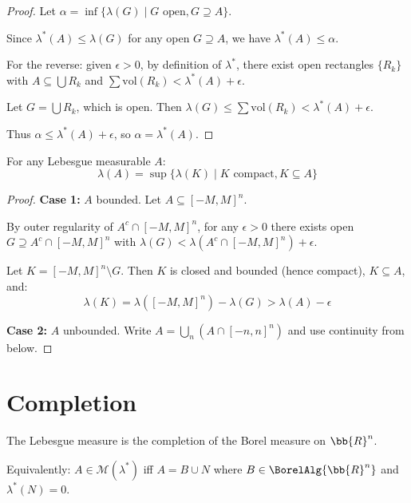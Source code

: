 \begin{proof}
Let $\alpha = \inf \{ \lambda(G) \mid G \text{ open}, G \supseteq A \}$.

Since $\lambda^*(A) \leq \lambda(G)$ for any open $G \supseteq A$, we have $\lambda^*(A) \leq \alpha$.

For the reverse: given $\epsilon > 0$, by definition of $\lambda^*$, there exist open rectangles $\{R_k\}$ with $A \subseteq \bigcup R_k$ and $\sum \text{vol}(R_k) < \lambda^*(A) + \epsilon$.

Let $G = \bigcup R_k$, which is open. Then $\lambda(G) \leq \sum \text{vol}(R_k) < \lambda^*(A) + \epsilon$.

Thus $\alpha \leq \lambda^*(A) + \epsilon$, so $\alpha = \lambda^*(A)$.
\end{proof}

\begin{theorem}
For any Lebesgue measurable $A$:
\[ \lambda(A) = \sup \{ \lambda(K) \mid K \text{ compact}, K \subseteq A \} \]
\end{theorem}

\begin{proof}
\textbf{Case 1:} $A$ bounded. Let $A \subseteq [-M, M]^n$.

By outer regularity of $A^c \cap [-M,M]^n$, for any $\epsilon > 0$ there exists open $G \supseteq A^c \cap [-M,M]^n$ with $\lambda(G) < \lambda(A^c \cap [-M,M]^n) + \epsilon$.

Let $K = [-M,M]^n \setminus G$. Then $K$ is closed and bounded (hence compact), $K \subseteq A$, and:
\[ \lambda(K) = \lambda([-M,M]^n) - \lambda(G) > \lambda(A) - \epsilon \]

\textbf{Case 2:} $A$ unbounded. Write $A = \bigcup_n (A \cap [-n,n]^n)$ and use continuity from below.
\end{proof}

\section{Completion}

\begin{theorem}
The Lebesgue measure is the completion of the Borel measure on $\bb{R}^n$.

Equivalently: $A \in \mathcal{M}(\lambda^*)$ iff $A = B \cup N$ where $B \in \BorelAlg{\bb{R}^n}$ and $\lambda^*(N) = 0$.
\end{theorem}

